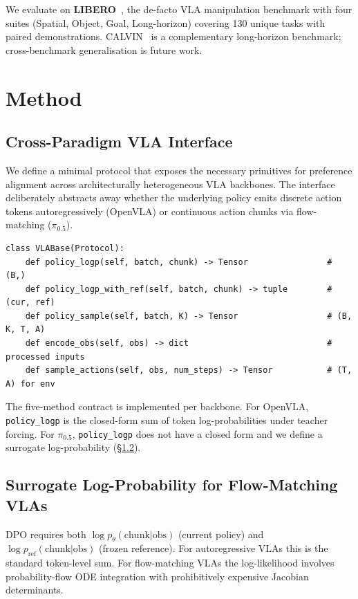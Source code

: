 \documentclass{article}
\begin{document}
We evaluate on \textbf{LIBERO}~\cite{liu2023libero}, the de-facto VLA manipulation benchmark with four suites (Spatial, Object, Goal, Long-horizon) covering 130 unique tasks with paired demonstrations. CALVIN~\cite{mees2022calvin} is a complementary long-horizon benchmark; cross-benchmark generalisation is future work.

\section{Method}

\subsection{Cross-Paradigm VLA Interface}

We define a minimal protocol that exposes the necessary primitives for preference alignment across architecturally heterogeneous VLA backbones. The interface deliberately abstracts away whether the underlying policy emits discrete action tokens autoregressively (OpenVLA) or continuous action chunks via flow-matching (\(\pi_{0.5}\)).

{\small
\begin{verbatim}
class VLABase(Protocol):
    def policy_logp(self, batch, chunk) -> Tensor                # (B,)
    def policy_logp_with_ref(self, batch, chunk) -> tuple        # (cur, ref)
    def policy_sample(self, batch, K) -> Tensor                  # (B, K, T, A)
    def encode_obs(self, obs) -> dict                            # processed inputs
    def sample_actions(self, obs, num_steps) -> Tensor           # (T, A) for env
\end{verbatim}
}

The five-method contract is implemented per backbone. For OpenVLA, \texttt{policy\_logp} is the closed-form sum of token log-probabilities under teacher forcing. For \(\pi_{0.5}\), \texttt{policy\_logp} does not have a closed form and we define a surrogate log-probability (\S\ref{sec:surrogate}).

\subsection{Surrogate Log-Probability for Flow-Matching VLAs}\label{sec:surrogate}

DPO requires both \(\log p_\theta(\text{chunk}|\text{obs})\) (current policy) and \(\log p_\text{ref}(\text{chunk}|\text{obs})\) (frozen reference). For autoregressive VLAs this is the standard token-level sum. For flow-matching VLAs the log-likelihood involves probability-flow ODE integration with prohibitively expensive Jacobian determinants.
\end{document}
